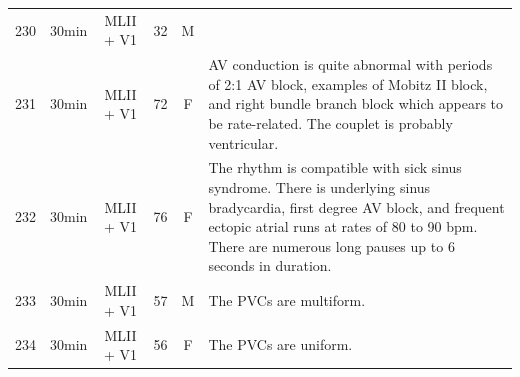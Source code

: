 \documentclass[a4paper,10pt,twoside]{article}
\begin{document}
\begin{table}
\begin{tabular}{c|c|c|c|c|p{14cm}}
 230 & 30min & MLII + V1 & 32 & M & \\
 231 & 30min & MLII + V1 & 72 & F & AV conduction is quite abnormal with periods of 2:1 AV block, examples of Mobitz II block, and right bundle branch block which appears to be rate-related.  The couplet is probably ventricular.\\
 232 & 30min & MLII + V1 & 76 & F & The rhythm is compatible with sick sinus syndrome. There is underlying sinus bradycardia, first degree AV block, and frequent ectopic atrial runs at rates of 80 to 90 bpm. There are numerous long pauses up to 6 seconds in duration.\\
 233 & 30min & MLII + V1 & 57 & M & The PVCs are multiform.\\
 234 & 30min & MLII + V1 & 56 & F & The PVCs are uniform.\\
 
 \hline
 \end{tabular}
\end{table}
\end{document}
